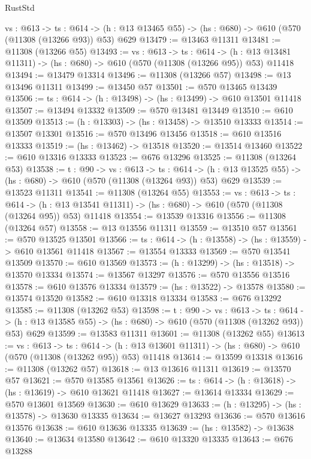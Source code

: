 \begin{lexlean}{RustStd}
\begin{coremodule}
  {vs : @613} ->
  {ts : @614} -> (h : @13 @13465 @55) -> (hs : @680) -> @610 (@570 (@11308 (@13266 @93)) @53) @629
@13479 := @13463 @11311
@13481 := @11308 (@13266 @55)
@13493 := {vs : @613} ->
  {ts : @614} ->
  (h : @13 @13481 @11311) -> (hs : @680) -> @610 (@570 (@11308 (@13266 @95)) @53) @11418
@13494 := @13479 @13314
@13496 := @11308 (@13266 @57)
@13498 := @13 @13496 @11311
@13499 := @13450 @57
@13501 := @570 @13465 @13439
@13506 := {ts : @614} -> (h : @13498) -> (hs : @13499) -> @610 @13501 @11418
@13507 := @13494 @13332
@13509 := @570 @13481 @13449
@13510 := @610 @13509
@13513 := (h : @13303) -> (hs : @13458) -> @13510 @13333
@13514 := @13507 @13301
@13516 := @570 @13496 @13456
@13518 := @610 @13516 @13333
@13519 := (hs : @13462) -> @13518
@13520 := @13514 @13460
@13522 := @610 @13316 @13333
@13523 := @676 @13296
@13525 := @11308 (@13264 @53)
@13538 := {t : @90} ->
  {vs : @613} ->
  {ts : @614} -> (h : @13 @13525 @55) -> (hs : @680) -> @610 (@570 (@11308 (@13264 @93)) @53) @629
@13539 := @13523 @11311
@13541 := @11308 (@13264 @55)
@13553 := {vs : @613} ->
  {ts : @614} ->
  (h : @13 @13541 @11311) -> (hs : @680) -> @610 (@570 (@11308 (@13264 @95)) @53) @11418
@13554 := @13539 @13316
@13556 := @11308 (@13264 @57)
@13558 := @13 @13556 @11311
@13559 := @13510 @57
@13561 := @570 @13525 @13501
@13566 := {ts : @614} -> (h : @13558) -> (hs : @13559) -> @610 @13561 @11418
@13567 := @13554 @13333
@13569 := @570 @13541 @13509
@13570 := @610 @13569
@13573 := (h : @13299) -> (hs : @13518) -> @13570 @13334
@13574 := @13567 @13297
@13576 := @570 @13556 @13516
@13578 := @610 @13576 @13334
@13579 := (hs : @13522) -> @13578
@13580 := @13574 @13520
@13582 := @610 @13318 @13334
@13583 := @676 @13292
@13585 := @11308 (@13262 @53)
@13598 := {t : @90} ->
  {vs : @613} ->
  {ts : @614} -> (h : @13 @13585 @55) -> (hs : @680) -> @610 (@570 (@11308 (@13262 @93)) @53) @629
@13599 := @13583 @11311
@13601 := @11308 (@13262 @55)
@13613 := {vs : @613} ->
  {ts : @614} ->
  (h : @13 @13601 @11311) -> (hs : @680) -> @610 (@570 (@11308 (@13262 @95)) @53) @11418
@13614 := @13599 @13318
@13616 := @11308 (@13262 @57)
@13618 := @13 @13616 @11311
@13619 := @13570 @57
@13621 := @570 @13585 @13561
@13626 := {ts : @614} -> (h : @13618) -> (hs : @13619) -> @610 @13621 @11418
@13627 := @13614 @13334
@13629 := @570 @13601 @13569
@13630 := @610 @13629
@13633 := (h : @13295) -> (hs : @13578) -> @13630 @13335
@13634 := @13627 @13293
@13636 := @570 @13616 @13576
@13638 := @610 @13636 @13335
@13639 := (hs : @13582) -> @13638
@13640 := @13634 @13580
@13642 := @610 @13320 @13335
@13643 := @676 @13288

\end{coremodule}
\end{lexlean}
